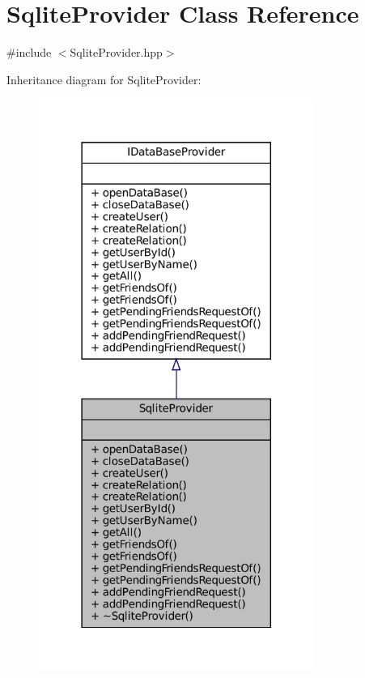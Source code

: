 \hypertarget{classSqliteProvider}{}\section{Sqlite\+Provider Class Reference}
\label{classSqliteProvider}


{\ttfamily \#include $<$Sqlite\+Provider.\+hpp$>$}



Inheritance diagram for Sqlite\+Provider\+:
\nopagebreak
\begin{figure}[H]
\begin{center}
\leavevmode
\includegraphics[width=255pt]{classSqliteProvider__inherit__graph}
\end{center}
\end{figure}


